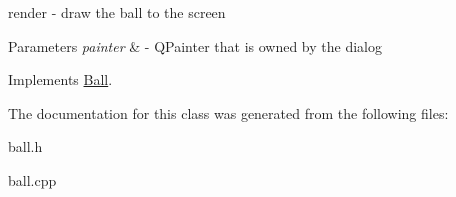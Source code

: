 render -\/ draw the ball to the screen 


\begin{DoxyParams}{Parameters}
{\em painter} & -\/ Q\+Painter that is owned by the dialog \\
\hline
\end{DoxyParams}


Implements \mbox{\hyperlink{class_ball_a307773aaa59aee90cef8767b0c22deca}{Ball}}.



The documentation for this class was generated from the following files\+:\begin{DoxyCompactItemize}
\item 
ball.\+h\item 
ball.\+cpp\end{DoxyCompactItemize}
